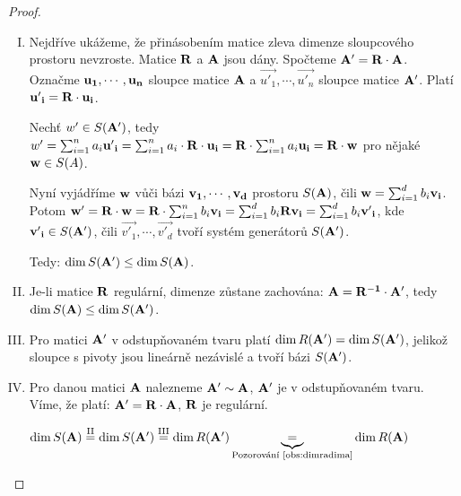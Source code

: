 \begin{proof}
    \leavevmode
    \begin{enumerate}[I.]
        \item Nejdříve ukážeme, že přinásobením matice zleva dimenze
            sloupcového prostoru nevzroste. Matice $\mathbf{R}$ a $\mathbf{A}$
            jsou dány. Spočteme $\mathbf{A'} = \mathbf{R} \cdot \mathbf{A}$.
            Označme $\mathbf{u_1}, \cdots, \mathbf{u_n}$ sloupce matice $\mathbf{A}$ a
            $\vec{{u'}_1}, \cdots, \vec{{u'}_n}$ sloupce matice $\mathbf{A'}$. 
            Platí $\mathbf{{u'}_i} = \mathbf{R} \cdot \mathbf{u_i}$. 

            Nechť $w' \in S(\mathbf{A'})$, tedy $w' = \sum_{i=1}^{n} a_i 
            \mathbf{{u'}_i} =
            \sum_{i=1}^{n} a_i \cdot \mathbf{R} \cdot \mathbf{u_i} = \mathbf{R} \cdot 
            \sum_{i=1}^{n} a_i \mathbf{u_i} = \mathbf{R} \cdot \mathbf{w}$ pro nějaké 
            $\mathbf{w} \in S(A)$.

            Nyní vyjádříme $\mathbf{w}$ vůči bázi $\mathbf{v_1}, \cdots, \mathbf{v_d}$ prostoru 
            $S(\mathbf{A})$, čili $\mathbf{w} = \sum_{i=1}^{d} b_i \mathbf{v_i}$. Potom
            $\mathbf{w'} = \mathbf{R} \cdot \mathbf{w} = \mathbf{R} \cdot \sum_{i=1}^{n} 
            b_i \mathbf{v_i} = \sum_{i=1}^{d} b_i \mathbf{R} \mathbf{v_i} = \sum_{i=1}^{d} 
            b_i \mathbf{{v'}_i}$, kde $\mathbf{{v'}_i} \in S(\mathbf{A'})$, 
            čili $\vec{{v'}_1}, \cdots, \vec{{v'}_d}$ tvoří systém 
            generátorů $S(\mathbf{A'})$.

            Tedy: $\mathop{\mathrm{dim}} S(\mathbf{A'}) \leq \mathop{\mathrm{dim}} S(\mathbf{A})$.

        \item Je-li matice $\mathbf{R}$ regulární, dimenze zůstane zachována:
            $\mathbf{A} = \mathbf{R^{-1}} \cdot \mathbf{A'}$, tedy $\mathop{\mathrm{dim}} S(\mathbf{A}) 
            \leq \mathop{\mathrm{dim}} S(\mathbf{A'})$.

        \item Pro matici $\mathbf{A'}$ v odstupňovaném tvaru platí 
            $\mathop{\mathrm{dim}} R(\mathbf{A'}) = \mathop{\mathrm{dim}} S(\mathbf{A'})$, jelikož sloupce s pivoty
            jsou lineárně nezávislé a tvoří bázi $S(\mathbf{A'})$.

        \item Pro danou matici $\mathbf{A}$ nalezneme $\mathbf{A'} \sim \mathbf{A}$,
            $\mathbf{A'}$ je v odstupňovaném tvaru. Víme, že platí: 
            $\mathbf{A'} = \mathbf{R} \cdot \mathbf{A}$, $\mathbf{R}$ je regulární.

            $\dim{S(\mathbf{A})} \stackrel{\text{II}}{=} \mathop{\mathrm{dim}} S(\mathbf{A'})
            \stackrel{\text{III}}{=} \mathop{\mathrm{dim}} R(\mathbf{A'}) 
            \underbrace{=}_{\text{Pozorování~\ref{obs:dimradima}}} 
                \mathop{\mathrm{dim}} R(\mathbf{A})$
    \end{enumerate}
\end{proof}

